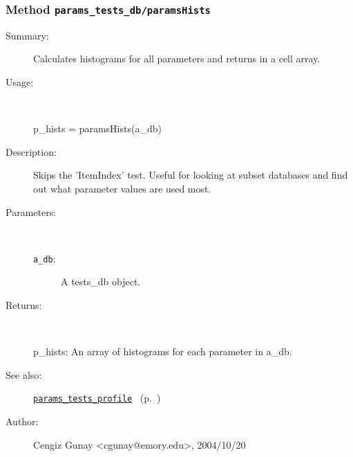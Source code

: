 \subsubsection[Method \texttt{paramsHists}]{Method \texttt{params\_tests\_db/paramsHists}}%
%
\label{ref_params_tests_db__paramsHists}%
\hypertarget{ref_params_tests_db__paramsHists}{}%
\begin{description}
\item[Summary:]Calculates histograms for all parameters and returns in a 
		cell array.
%
\item[Usage:]~%
\begin{lyxcode}%
p\_hists = paramsHists(a\_db)
%
\end{lyxcode}%
%
\item[Description:]%
Skips the 'ItemIndex' test. Useful for looking at subset databases and
 find out what parameter values are used most.
\item[Parameters:]~
\begin{description}%
\item[\texttt{a\_db}:]
 A tests\_db object.
\end{description}%
%
\item[Returns:]~

	p\_hists: An array of histograms for each parameter in a\_db.
%
%
\item[See also:]%
\hyperlink{ref_params_tests_profile}{\texttt{params\_tests\_profile}}%
\ (p.~\pageref{ref_params_tests_profile})%
%
%
\item[Author:]%
Cengiz Gunay <cgunay@emory.edu>, 2004/10/20%
\end{description}
\methodline%
